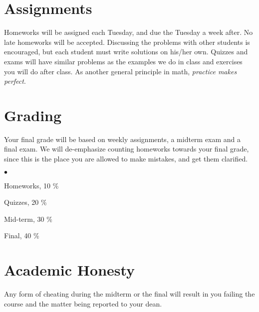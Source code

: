 \documentclass[margin,line]{res}
\newenvironment{list2}{
  \begin{list}{$\bullet$}{%
      \setlength{\itemsep}{0in}
      \setlength{\parsep}{0in} \setlength{\parskip}{0in}
      \setlength{\topsep}{0in} \setlength{\partopsep}{0in}
      \setlength{\leftmargin}{0.2in}}}{\end{list}}
\begin{document}
\begin{resume}
\section{\sc Assignments}
Homeworks will be assigned each Tuesday, and due the Tuesday a week after. No late homeworks will be accepted. Discussing the problems with other students is encouraged, but each student must write solutions on his/her own. Quizzes and exams will have similar problems as the examples we
do in class and exercises you will do after class. As another general principle in math,
\emph{practice makes perfect}.

\section{\sc Grading}
Your final grade will be based on weekly assignments, a midterm exam and a final exam. We will de-emphasize counting homeworks towards your final grade, since this is the place you are allowed to make mistakes, and get them clarified.
\\

\begin{list2}
\item Homeworks, 10 \%
\item Quizzes, 20 \%
\item Mid-term, 30 \%
\item Final, 40 \%
\end{list2}

\section{\sc Academic Honesty} Any form of
cheating during the midterm or the final will result in you failing the
course and the matter being reported to your dean.

\end{resume}
\end{document}
